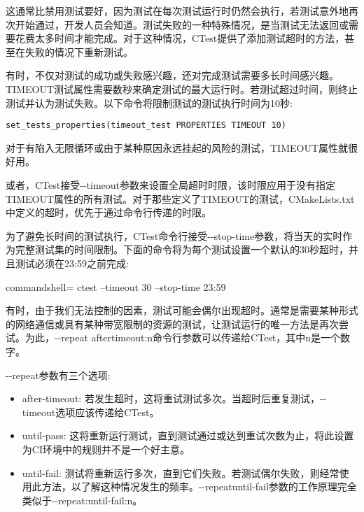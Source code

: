 这通常比禁用测试要好，因为测试在每次测试运行时仍然会执行，若测试意外地再次开始通过，开发人员会知道。测试失败的一种特殊情况，是当测试无法返回或需要花费太多时间才能完成。对于这种情况，CTest提供了添加测试超时的方法，甚至在失败的情况下重新测试。


有时，不仅对测试的成功或失败感兴趣，还对完成测试需要多长时间感兴趣。TIMEOUT测试属性需要数秒来确定测试的最大运行时。若测试超过时间，则终止测试并认为测试失败。以下命令将限制测试的测试执行时间为10秒:

\begin{lstlisting}[style=styleCMake]
set_tests_properties(timeout_test PROPERTIES TIMEOUT 10)
\end{lstlisting}

对于有陷入无限循环或由于某种原因永远挂起的风险的测试，TIMEOUT属性就很好用。

或者，CTest接受-{}-timeout参数来设置全局超时时限，该时限应用于没有指定TIMEOUT属性的所有测试。对于那些定义了TIMEOUT的测试，CMakeLists.txt中定义的超时，优先于通过命令行传递的时限。

为了避免长时间的测试执行，CTest命令行接受-{}-stop-time参数，将当天的实时作为完整测试集的时间限制。下面的命令将为每个测试设置一个默认的30秒超时，并且测试必须在23:59之前完成:

\begin{tcblisting}{commandshell={}}
ctest --timeout 30 --stop-time 23:59
\end{tcblisting}

有时，由于我们无法控制的因素，测试可能会偶尔出现超时。通常是需要某种形式的网络通信或具有某种带宽限制的资源的测试，让测试运行的唯一方法是再次尝试。为此，-{}-repeat aftertimeout:n命令行参数可以传递给CTest，其中n是一个数字。

-{}-repeat参数有三个选项:

\begin{itemize}
\item 
after-timeout: 若发生超时，这将重试测试多次。当超时后重复测试，-{}-timeout选项应该传递给CTest。

\item 
until-pass: 这将重新运行测试，直到测试通过或达到重试次数为止，将此设置为CI环境中的规则并不是一个好主意。

\item 
until-fail: 测试将重新运行多次，直到它们失败。若测试偶尔失败，则经常使用此方法，以了解这种情况发生的频率。-{}-repeatuntil-fail参数的工作原理完全类似于-{}-repeat:until-fail:n。
\end{itemize}

